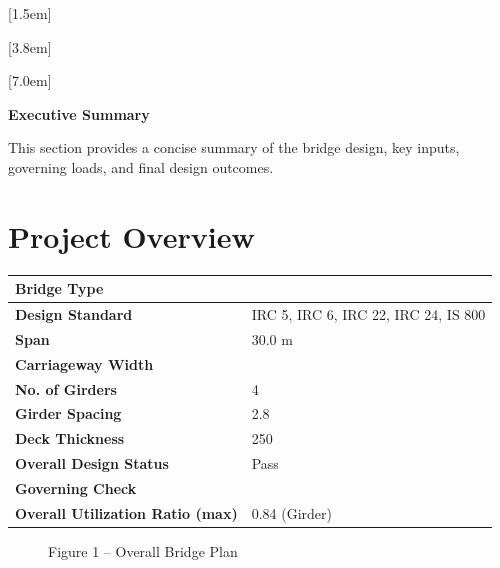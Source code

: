 \documentclass[12pt,a4paper]{report}
\numberwithin{table}{chapter}
\numberwithin{figure}{chapter}
\begin{document}
[1.5em]
  {\normalfont\vspace{2pt}}
  {\contentslabel{1.5em}}
  {\hspace*{-1.5em}}
  {\hfill\contentspage}

[3.8em]
  {\normalfont}
  {\contentslabel{2.3em}}
  {\hspace*{-2.3em}}
  {\hfill\contentspage}

[7.0em]
  {\normalfont}
  {\contentslabel{3.2em}}
  {\hspace*{-3.2em}}
  {\hfill\contentspage}

\newpage
\renewcommand{\contentsname}{\centering\Large\bfseries Table of Contents}
\tableofcontents


\newpage
{\centering\Large\bfseries Executive Summary\par}
\vspace{0.8em}

This section provides a concise summary of the bridge design, key inputs, governing loads, and final design outcomes.

\section*{Project Overview}
\label{sec:project-overview}


\begin{tabular}{|L{5.5cm}|L{8.5cm}|}
\hline
\textbf{Bridge Type} &  \\
\hline
\textbf{Design Standard} & IRC 5, IRC 6, IRC 22, IRC 24, IS 800 \\
\hline
\textbf{Span} & 30.0 m \\
\hline
\textbf{Carriageway Width} &  \\
\hline
\textbf{No. of Girders} & 4 \\
\hline
\textbf{Girder Spacing} & 2.8 \\
\hline
\textbf{Deck Thickness} & 250 \\
\hline
\textbf{Overall Design Status} & Pass \\
\hline
\textbf{Governing Check} &  \\
\hline
\textbf{Overall Utilization Ratio (max)} & 0.84 (Girder) \\
\hline
\end{tabular}


\begin{figure}[H]
\centering
{}
\caption*{Figure 1 -- Overall Bridge Plan}
\end{figure}
\end{document}
